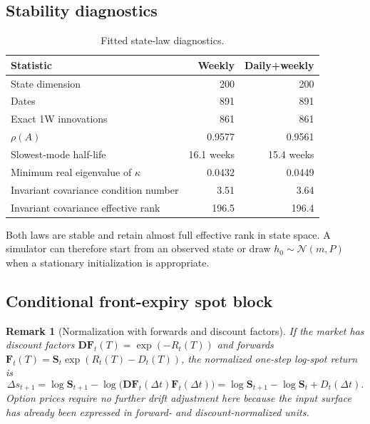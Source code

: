 \documentclass[11pt,a4paper]{article}
\newtheorem{remark}[definition]{Remark}
\begin{document}
\subsection{Stability diagnostics}

\begin{table}[H]
\centering
\begin{tabular}{lrr}
\toprule
Statistic & Weekly & Daily+weekly\\
\midrule
State dimension & 200 & 200\\
Dates & 891 & 891\\
Exact 1W innovations & 861 & 861\\
$\rho(A)$ & 0.9577 & 0.9561\\
Slowest-mode half-life & 16.1 weeks & 15.4 weeks\\
Minimum real eigenvalue of $\kappa$ & 0.0432 & 0.0449\\
Invariant covariance condition number & 3.51 & 3.64\\
Invariant covariance effective rank & 196.5 & 196.4\\
\bottomrule
\end{tabular}
\caption{Fitted state-law diagnostics.}
\label{tab:stability}
\end{table}

Both laws are stable and retain almost full effective rank in state space.  A
simulator can therefore start from an observed state or draw
$h_0\sim\mathcal N(m,P)$ when a stationary initialization is appropriate.

\subsection{Conditional front-expiry spot block}


\begin{remark}[Normalization with forwards and discount factors]
\label{rem:driftreturnsa}
If the market has discount factors
$\bm{DF}_t(T)=\exp(-R_t(T))$ and forwards
$\bm{F}_t(T)=\bm{S}_t\exp(R_t(T)-D_t(T))$, the normalized one-step
log-spot return is
\[
  \Delta s_{t+1}
  =\log\bm{S}_{t+1}
   -\log\!\bigl(\bm{DF}_t(\Delta t)\bm{F}_t(\Delta t)\bigr)
  =\log\bm{S}_{t+1}-\log\bm{S}_t+D_t(\Delta t).
\]
Option prices require no further drift adjustment here because the input
surface has already been expressed in forward- and discount-normalized units.
\end{remark}
\end{document}
